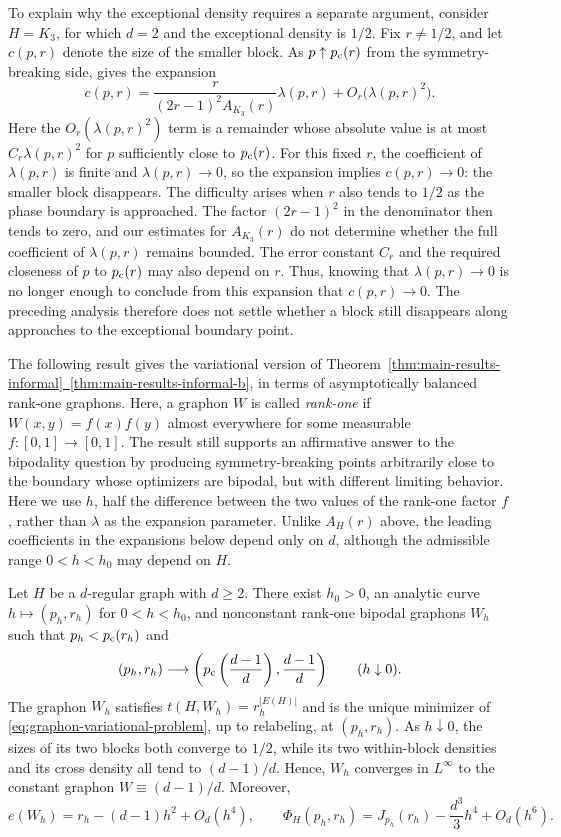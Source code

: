 To explain why the exceptional density requires a separate argument,
consider $H=K_3$, for which $d=2$ and the exceptional density is $1/2$.
Fix $r\ne1/2$, and let $c(p,r)$ denote the size of the smaller
block.  As $p\uparrow p_{\mathrm c}(r)$ from the symmetry-breaking side,
 gives the expansion
\[
  c(p,r)
  =\frac{r}{(2r-1)^2A_{K_3}(r)}\lambda(p,r)
   +O_r\bigl(\lambda(p,r)^2\bigr).
\]
Here the $O_r(\lambda(p,r)^2)$ term is a remainder whose absolute value is
at most $C_r\lambda(p,r)^2$ for $p$ sufficiently close to $p_{\mathrm c}(r)$.
For this fixed $r$, the coefficient of $\lambda(p,r)$ is finite and
$\lambda(p,r)\to0$, so the expansion implies $c(p,r)\to0$: the smaller
block disappears.
The difficulty arises when $r$ also tends to $1/2$ as the phase boundary is
approached.  The factor $(2r-1)^2$ in the denominator then tends to zero,
and our estimates for $A_{K_3}(r)$ do not determine whether the full
coefficient of $\lambda(p,r)$ remains bounded.
The error constant $C_r$ and the required closeness of $p$ to $p_{\mathrm c}(r)$ may
also depend on $r$.  Thus, knowing that $\lambda(p,r)\to0$ is no longer
enough to conclude from this expansion that $c(p,r)\to0$.
The preceding analysis therefore does not settle whether a block still
disappears along approaches to the exceptional boundary point.

The following result gives the variational version of
Theorem~\hyperref[thm:main-results-informal-b]{\ref*{thm:main-results-informal}~\ref*{thm:main-results-informal-b}},
in terms of asymptotically balanced rank-one graphons.  Here, a graphon $W$ is called
\emph{rank-one} if $W(x,y)=f(x)f(y)$ almost everywhere for some measurable
$f:[0,1]\to[0,1]$.  The result still supports an affirmative answer to the
bipodality question by producing symmetry-breaking points arbitrarily close to the boundary
whose optimizers are bipodal, but with different limiting behavior.
Here we use $h$, half the difference between the two values of the rank-one
factor $f$, rather than $\lambda$ as the expansion parameter.
Unlike $A_H(r)$ above, the leading coefficients in the expansions below
depend only on $d$, although the admissible range $0<h<h_0$ may depend on $H$.
\begin{theorem}\label{thm:endpoint-optimizers}
Let $H$ be a $d$-regular graph with $d\ge2$.  There exist $h_0>0$, an
analytic curve $h\mapsto(p_h,r_h)$ for $0<h<h_0$, and nonconstant rank-one
bipodal graphons $W_h$ such that $p_h<p_{\mathrm c}(r_h)$ and
\[
  (p_h,r_h)\longrightarrow
  \left(p_{\mathrm c}\left(\frac{d-1}{d}\right),\frac{d-1}{d}\right)
  \qquad
  (h\downarrow0).
\]
The graphon $W_h$ satisfies $t(H,W_h)=r_h^{|E(H)|}$
and is the unique minimizer of \eqref{eq:graphon-variational-problem}, up to
relabeling, at $(p_h,r_h)$.  As $h\downarrow0$,
the sizes of its two blocks both converge to $1/2$, while its two within-block densities
and its cross density all tend to $(d-1)/d$.  Hence, $W_h$
converges in $L^\infty$ to the constant graphon $W\equiv(d-1)/d$.
Moreover,
\[
  e(W_h)=r_h-(d-1)h^2+O_d(h^4),
  \qquad
  \Phi_H(p_h,r_h)=J_{p_h}(r_h)-\frac{d^3}{3}h^4+O_d(h^6).
\]
\end{theorem}

